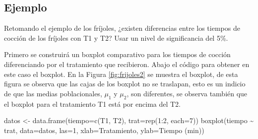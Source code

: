 \documentclass[
]{book}
\makeatletter
\newenvironment{Shaded}{\begin{snugshade}}{\end{snugshade}}
\newcommand{\AttributeTok}[1]{\textcolor[rgb]{0.77,0.63,0.00}{#1}}
\newcommand{\DecValTok}[1]{\textcolor[rgb]{0.00,0.00,0.81}{#1}}
\newcommand{\FunctionTok}[1]{\textcolor[rgb]{0.00,0.00,0.00}{#1}}
\newcommand{\NormalTok}[1]{#1}
\newcommand{\OtherTok}[1]{\textcolor[rgb]{0.56,0.35,0.01}{#1}}
\newcommand{\SpecialCharTok}[1]{\textcolor[rgb]{0.00,0.00,0.00}{#1}}
\newcommand{\StringTok}[1]{\textcolor[rgb]{0.31,0.60,0.02}{#1}}
\newenvironment{kframe}{%
\medskip{}
\setlength{\fboxsep}{.8em}
 \def\at@end@of@kframe{}%
 \ifinner\ifhmode%
  \def\at@end@of@kframe{\end{minipage}}%
  \begin{minipage}{\columnwidth}%
 \fi\fi%
 \def\FrameCommand##1{\hskip\@totalleftmargin \hskip-\fboxsep
 \colorbox{shadecolor}{##1}\hskip-\fboxsep
     \hskip-\linewidth \hskip-\@totalleftmargin \hskip\columnwidth}%
 \MakeFramed {\advance\hsize-\width
   \@totalleftmargin\z@ \linewidth\hsize
   \@setminipage}}%
 {\par\unskip\endMakeFramed%
 \at@end@of@kframe}
\renewenvironment{Shaded}{\begin{kframe}}{\end{kframe}}
\makeatother
\begin{document}
\hypertarget{ejemplo-71}{%
\subsection*{Ejemplo}\label{ejemplo-71}}

Retomando el ejemplo de los fríjoles, ¿existen diferencias entre los tiempos de cocción de los fríjoles con T1 y T2? Usar un nivel de significancia del 5\%.

Primero se construirá un boxplot comparativo para los tiempos de cocción diferenciando por el tratamiento que recibieron. Abajo el código para obtener en este caso el boxplot. En la Figura \ref{fig:frijoles2} se muestra el boxplot, de esta figura se observa que las cajas de los boxplot no se traslapan, esto es un indicio de que las medias poblacionales, \(\mu_1\) y \(\mu_2\), son diferentes, se observa también que el boxplot para el tratamiento T1 está por encima del T2.

\begin{Shaded}
\begin{Highlighting}[]
\NormalTok{datos }\OtherTok{\textless{}{-}} \FunctionTok{data.frame}\NormalTok{(}\AttributeTok{tiempo=}\FunctionTok{c}\NormalTok{(T1, T2), }\AttributeTok{trat=}\FunctionTok{rep}\NormalTok{(}\DecValTok{1}\SpecialCharTok{:}\DecValTok{2}\NormalTok{, }\AttributeTok{each=}\DecValTok{7}\NormalTok{))}
\FunctionTok{boxplot}\NormalTok{(tiempo }\SpecialCharTok{\textasciitilde{}}\NormalTok{ trat, }\AttributeTok{data=}\NormalTok{datos, }\AttributeTok{las=}\DecValTok{1}\NormalTok{,}
        \AttributeTok{xlab=}\StringTok{\textquotesingle{}Tratamiento\textquotesingle{}}\NormalTok{, }\AttributeTok{ylab=}\StringTok{\textquotesingle{}Tiempo (min)\textquotesingle{}}\NormalTok{)}
\end{Highlighting}
\end{Shaded}
\end{document}
